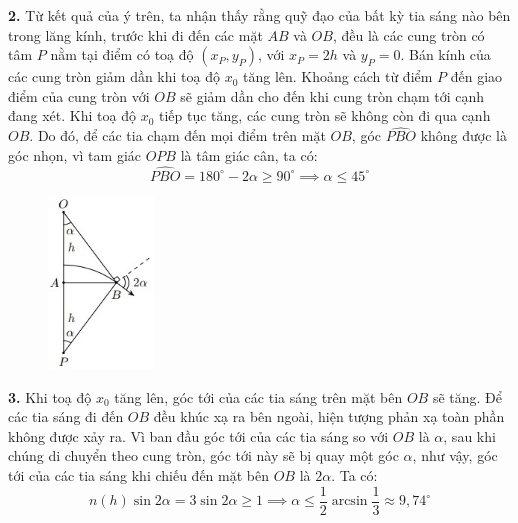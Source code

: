 \noindent\textbf{2.} Từ kết quả của ý trên, ta nhận thấy rằng quỹ đạo của bất kỳ tia sáng nào bên trong lăng kính, trước khi đi đến các mặt $AB$ và $OB$, đều là các cung tròn có tâm $P$ nằm tại điểm có toạ độ $(x_{P},y_{P})$, với $x_{P}=2h$ và $y_{P}=0$. Bán kính của các cung tròn giảm dần khi toạ độ $x_{0}$ tăng lên. Khoảng cách từ điểm $P$ đến giao điểm của cung tròn với $OB$ sẽ giảm dần cho đến khi cung tròn chạm tới cạnh đang xét. Khi toạ độ $x_{0}$ tiếp tục tăng, các cung tròn sẽ không còn đi qua cạnh $OB$. Do đó, để các tia chạm đến mọi điểm trên mặt $OB$, góc $\hat{PBO}$ không được là góc nhọn, vì tam giác $OPB$ là tâm giác cân, ta có:
\begin{equation*}
  \hat{PBO}=180^{\circ}-2\alpha\geqslant 90^{\circ}\implies\alpha\leqslant 45^{\circ}
\end{equation*}

\begin{figure}
  \centering
  \vspace{-1cm}
  \includegraphics[width=0.25\textwidth]{Figures/Fig 5S3.jpg}
\end{figure}

\noindent\textbf{3.} Khi toạ độ $x_{0}$ tăng lên, góc tới của các tia sáng trên mặt bên $OB$ sẽ tăng. Để các tia sáng đi đến $OB$ đều khúc xạ ra bên ngoài, hiện tượng phản xạ toàn phần không được xảy ra. Vì ban đầu góc tới của các tia sáng so với $OB$ là $\alpha$, sau khi chúng di chuyển theo cung tròn, góc tới này sẽ bị quay một góc $\alpha$, như vậy, góc tới của các tia sáng khi chiếu đến mặt bên $OB$ là $2\alpha$. Ta có:
\begin{equation*}
  n(h)\sin 2\alpha=3\sin 2\alpha\geqslant 1\implies \alpha\leqslant\frac{1}{2}\arcsin\frac{1}{3}\approx9,74^{\circ}
\end{equation*}
